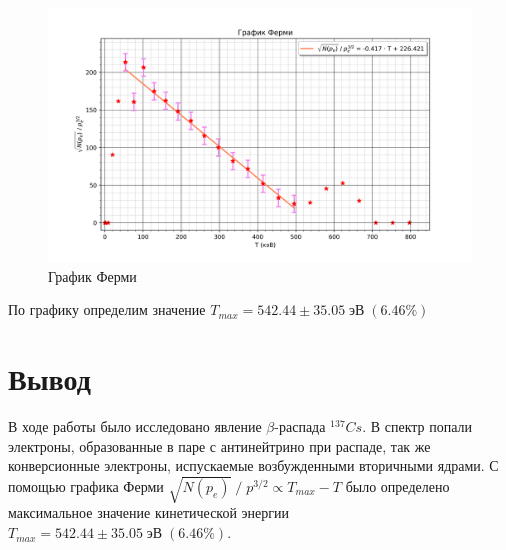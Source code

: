 \documentclass[a4paper]{article}
\begin{document}
\begin{enumerate}
    \begin{figure}[H]
        \begin{center}
        \includegraphics[scale = 0.7]{mkFermi.png}
        \caption{График Ферми}
        \label{g2}
        \end{center}
    \end{figure}

    По графику определим значение $T_{max} = 542.44 \pm 35.05\; \text{эВ} \;(6.46\%)$

\end{enumerate}

\section{Вывод}

В ходе работы было исследовано явление $\beta$-распада $^{137}Cs$. В спектр попали электроны, 
образованные в паре с антинейтрино при распаде, так же конверсионные электроны, испускаемые
возбужденными вторичными ядрами. С помощью графика Ферми $\sqrt{N(p_e)}\; / \; p^{3/2} \propto T_{max} - T$ 
было определено максимальное значение кинетической энергии $T_{max} = 542.44 \pm 35.05\; \text{эВ} \;(6.46\%)$.
\end{document}
